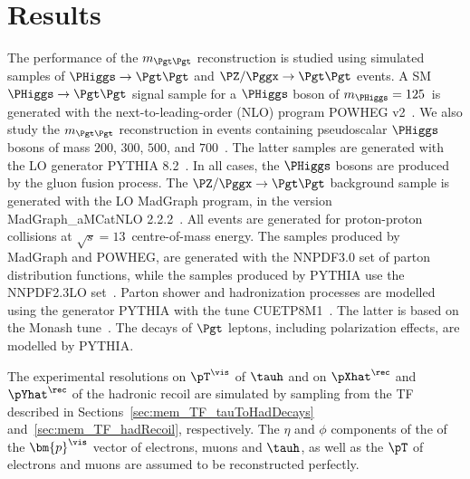 \section{Results}
\label{sec:results}

The performance of the $m_{\Pgt\Pgt}$ reconstruction is studied using
simulated samples of $\PHiggs \to \Pgt\Pgt$ and $\PZ/\Pggx \to
\Pgt\Pgt$ events.
A SM $\PHiggs \to \Pgt\Pgt$ signal sample for a $\PHiggs$ boson of $m_{\PHiggs} = 125$~\GeV is generated with the next-to-leading-order (NLO) program POWHEG v2~\cite{POWHEG1,POWHEG2,POWHEG3}.
We also study the $m_{\Pgt\Pgt}$ reconstruction in events containing pseudoscalar $\PHiggs$ bosons of mass $200$, $300$, $500$, and $700$~\GeV.
The latter samples are generated with the LO generator PYTHIA 8.2~\cite{pythia8}.
In all cases, the $\PHiggs$ bosons are produced by the gluon fusion process.
The $\PZ/\Pggx \to \Pgt\Pgt$ background sample is generated with the LO MadGraph program, in the version MadGraph\_aMCatNLO 2.2.2~\cite{MadGraph_aMCatNLO}.
All events are generated for proton-proton collisions at $\sqrt{s} = 13$~\TeV centre-of-mass energy.
The samples produced by MadGraph and POWHEG, are generated with the NNPDF3.0 set of parton distribution functions,
while the samples produced by PYTHIA use the NNPDF2.3LO set~\cite{NNPDF1,NNPDF2,NNPDF3}.
Parton shower and hadronization processes are modelled using the generator PYTHIA with the tune CUETP8M1~\cite{PYTHIA_CUETP8M1tune_CMS}.
The latter is based on the Monash tune~\cite{PYTHIA_MonashTune}.
The decays of $\Pgt$ leptons, including polarization effects, are modelled by PYTHIA.

The experimental resolutions on $\pT^{\vis}$ of $\tauh$ and on $\pXhat^{\rec}$ and $\pYhat^{\rec}$ of the hadronic recoil 
are simulated by sampling from the TF described in
Sections~\ref{sec:mem_TF_tauToHadDecays}
and~\ref{sec:mem_TF_hadRecoil}, respectively.
The $\eta$ and $\phi$ components of the of the $\bm{p}^{\vis}$ vector of electrons, muons and $\tauh$,
as well as the $\pT$ of electrons and muons are assumed to be reconstructed perfectly.


